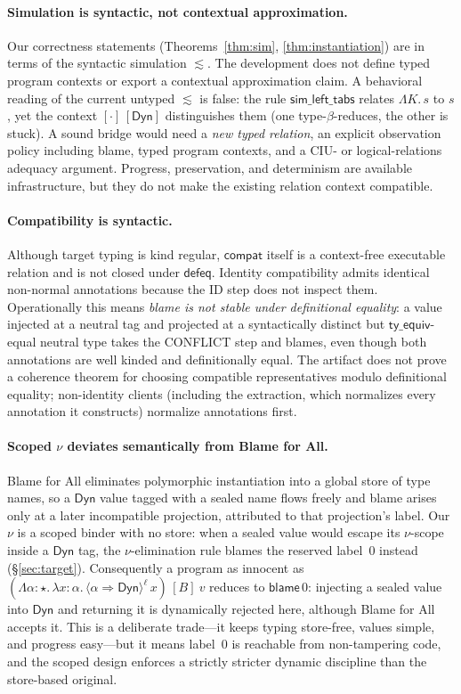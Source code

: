 \documentclass[acmsmall,anonymous=false,nonacm]{acmart}
\newcommand{\dyn}{\ensuremath{\mathsf{Dyn}}}
\newcommand{\kstar}{\ensuremath{\star}}
\newcommand{\cast}[4]{\langle #2 \Rightarrow #3 \rangle^{#4}\, #1}
\newcommand{\blame}[1]{\mathsf{blame}\,#1}
\newcommand{\sepsim}{\mathrel{\lesssim}}
\begin{document}
\paragraph{Simulation is syntactic, not contextual approximation.}
Our correctness statements (Theorems~\ref{thm:sim}, \ref{thm:instantiation}) are in terms
of the syntactic simulation $\sepsim$. The development does not define typed
program contexts or export a contextual approximation claim. A behavioral
reading of the current untyped $\sepsim$ is false: the rule $\mathsf{sim\_left\_tabs}$
relates $\Lambda K.\,s$ to $s$, yet the context $[\cdot]\,[\dyn]$ distinguishes
them (one type-$\beta$-reduces, the other is stuck). A sound bridge would need a
\emph{new typed relation}, an explicit observation policy including blame,
typed program contexts, and a CIU- or logical-relations adequacy argument.
Progress, preservation, and determinism are available infrastructure, but they
do not make the existing relation context compatible.

\paragraph{Compatibility is syntactic.}
Although target typing is kind regular, $\mathsf{compat}$ itself is a
context-free executable relation and is not closed under
$\mathsf{defeq}$. Identity compatibility admits identical non-normal
annotations because the ID step does not inspect them. Operationally this
means \emph{blame is not stable under definitional equality}: a value
injected at a neutral tag and projected at a syntactically distinct but
$\mathsf{ty\_equiv}$-equal neutral type takes the CONFLICT step and blames,
even though both annotations are well kinded and definitionally equal. The
artifact does not prove a coherence theorem for choosing compatible
representatives modulo definitional equality; non-identity clients (including
the extraction, which normalizes every annotation it constructs) normalize
annotations first.

\paragraph{Scoped $\nu$ deviates semantically from Blame for All.}
Blame for All eliminates polymorphic instantiation into a global store of
type names, so a $\dyn$ value tagged with a sealed name flows freely and
blame arises only at a later incompatible projection, attributed to that
projection's label. Our $\nu$ is a scoped binder with no store: when a
sealed value would escape its $\nu$-scope inside a $\dyn$ tag, the
$\nu$-elimination rule blames the reserved label~$0$ instead
(\S\ref{sec:target}). Consequently a program as innocent as
$(\Lambda\alpha{:}\kstar.\,\lambda x{:}\alpha.\,\cast{x}{\alpha}{\dyn}{\ell})\,[B]\ v$
reduces to $\blame 0$: injecting a sealed value into $\dyn$ and returning it
is dynamically rejected here, although Blame for All accepts it. This is a
deliberate trade---it keeps typing store-free, values simple, and progress
easy---but it means label~$0$ is reachable from non-tampering code, and the
scoped design enforces a strictly stricter dynamic discipline than the
store-based original.
\end{document}
